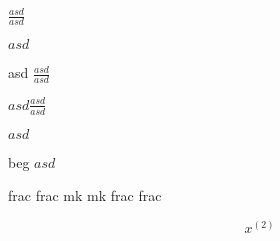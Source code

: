 
$\frac{asd}{asd}$


$asd$

asd $\frac{asd}{asd}$

$asd$$\frac{asd}{asd}$

$asd$

beg
$asd$

frac
frac
mk
mk
frac
frac        

\begin{equation}
   x^{(2)}    
\end{equation}

\(  \)
